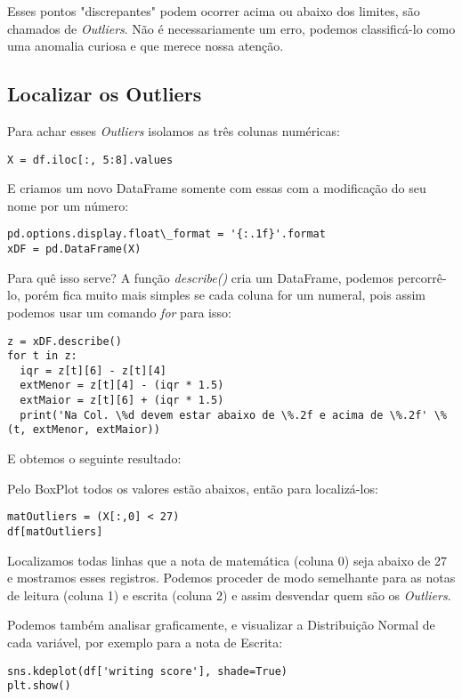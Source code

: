 Esses pontos "discrepantes" podem ocorrer acima ou abaixo dos limites, são chamados de \textit{Outliers}. Não é necessariamente um erro, podemos classificá-lo como uma anomalia curiosa e que merece nossa atenção.

\subsection{Localizar os Outliers}
Para achar esses \textit{Outliers} isolamos as três colunas numéricas:
\begin{lstlisting}
X = df.iloc[:, 5:8].values
\end{lstlisting}

E criamos um novo DataFrame somente com essas com a modificação do seu nome por um número:
\begin{lstlisting}
pd.options.display.float\_format = '{:.1f}'.format
xDF = pd.DataFrame(X)
\end{lstlisting}

Para quê isso serve? A função \textit{describe()} cria um DataFrame, podemos percorrê-lo, porém fica muito mais simples se cada coluna for um numeral, pois assim podemos usar um comando \textit{for} para isso:
\begin{lstlisting}
z = xDF.describe()
for t in z:
  iqr = z[t][6] - z[t][4]
  extMenor = z[t][4] - (iqr * 1.5)
  extMaior = z[t][6] + (iqr * 1.5)
  print('Na Col. \%d devem estar abaixo de \%.2f e acima de \%.2f' \% (t, extMenor, extMaior))
\end{lstlisting}

E obtemos o seguinte resultado: \\

Pelo BoxPlot todos os valores estão abaixos, então para localizá-los:
\begin{lstlisting}
matOutliers = (X[:,0] < 27)
df[matOutliers]
\end{lstlisting}

Localizamos todas linhas que a nota de matemática (coluna 0) seja abaixo de 27 e mostramos esses registros. Podemos proceder de modo semelhante para as notas de leitura (coluna 1) e escrita (coluna 2) e assim desvendar quem são os \textit{Outliers}.

Podemos também analisar graficamente, e visualizar a Distribuição Normal de cada variável, por exemplo para a nota de Escrita:
\begin{lstlisting}
sns.kdeplot(df['writing score'], shade=True)
plt.show()
\end{lstlisting}

